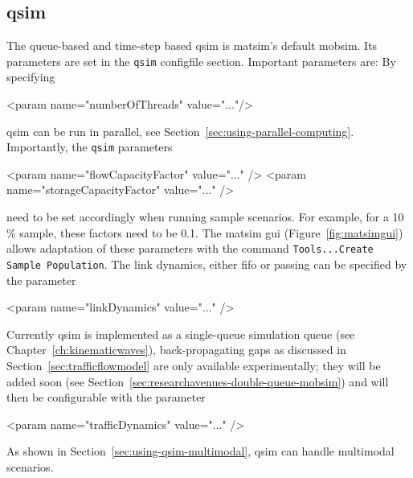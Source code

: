 \subsection{\protect\gls{qsim}}
\label{sec:using-qsim}
The queue-based and time-step based \gls{qsim} \citep[][]{Gawron_IJMPC_1998,SimonEtAl_IJMPC_1999,CetinBurriNagel2003queue,Dobler_TechRep_IVT_2011, Dobler_STRC_2010} is \gls{matsim}'s default \gls{mobsim}. 
Its parameters are set in the \lstinline|qsim| \gls{configfile} section. Important parameters are:
By specifying
\begin{xml}
   <param name="numberOfThreads" value="..."/>
\end{xml}
\gls{qsim} can be run in parallel, see Section~\ref{sec:using-parallel-computing}. 
%
Importantly, the \lstinline{qsim} parameters
\begin{xml}
    <param name="flowCapacityFactor" value="..." />
    <param name="storageCapacityFactor" value="..." />
\end{xml}
need to be set accordingly when running sample scenarios. For example, for a 10\,\% sample, these factors need to be 0.1. The \gls{matsim} \gls{gui} (Figure~\ref{fig:matsimgui}) allows adaptation of these parameters with the command \lstinline|Tools...Create Sample Population|.
%
The link dynamics, either \gls{fifo} or passing can be specified by the parameter 
\begin{xml}
   <param name="linkDynamics" value="..." />
\end{xml}
%
Currently \gls{qsim} is implemented as a single-queue simulation queue (see Chapter~\ref{ch:kinematicwaves}), \ie back-propagating gaps as discussed in Section~\ref{sec:trafficflowmodel} are only available experimentally; 
they will be added soon (see Section~\ref{sec:researchavenues-double-queue-mobsim}) and will then be configurable with the parameter
\begin{xml}
   <param name="trafficDynamics" value="..." />
\end{xml}
%
As shown in Section~\ref{sec:using-qsim-multimodal}, \gls{qsim} can handle \gls{multimodal} scenarios. %

